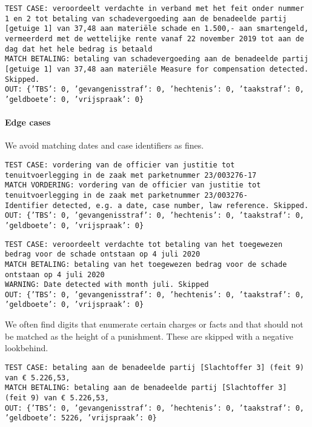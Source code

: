 \documentclass[a4paper]{article}
\begin{document}
\texttt{TEST CASE: %
veroordeelt verdachte in verband met het feit onder nummer 1 en 2 tot betaling van schadevergoeding aan de benadeelde partij [getuige 1] van  37,48 aan materiële schade en  1.500,- aan smartengeld, vermeerderd met de wettelijke rente vanaf 22 november 2019 tot aan de dag dat het hele bedrag is betaald\\
MATCH BETALING: betaling van schadevergoeding aan de benadeelde partij [getuige 1] van  37,48 aan materiële
Measure for compensation detected. Skipped.\\
OUT: \{'TBS': 0, 'gevangenisstraf': 0, 'hechtenis': 0, 'taakstraf': 0, 'geldboete': 0, 'vrijspraak': 0\}}

\paragraph{Edge cases}

We avoid matching dates and case identifiers as fines.

\texttt{TEST CASE:
vordering van de officier van justitie tot tenuitvoerlegging in de zaak met parketnummer 23/003276-17\\
MATCH VORDERING: vordering van de officier van justitie tot tenuitvoerlegging in de zaak met parketnummer 23/003276-\\
Identifier detected, e.g. a date, case number, law reference. Skipped.\\
OUT: \{'TBS': 0, 'gevangenisstraf': 0, 'hechtenis': 0, 'taakstraf': 0, 'geldboete': 0, 'vrijspraak': 0\}}

\texttt{TEST CASE:
veroordeelt verdachte tot betaling van het toegewezen bedrag voor de schade ontstaan op 4 juli 2020\\
MATCH BETALING: betaling van het toegewezen bedrag voor de schade ontstaan op 4 juli 2020\\
WARNING: Date detected with month juli. Skipped\\
OUT: \{'TBS': 0, 'gevangenisstraf': 0, 'hechtenis': 0, 'taakstraf': 0, 'geldboete': 0, 'vrijspraak': 0\}}

We often find digits that enumerate certain charges or facts and that should not be matched as the height of a punishment.
These are skipped with a negative lookbehind.

\texttt{TEST CASE: betaling aan de benadeelde partij [Slachtoffer 3] (feit 9) van € 5.226,53,\\
MATCH BETALING: betaling aan de benadeelde partij [Slachtoffer 3] (feit 9) van € 5.226,53,\\
OUT: \{'TBS': 0, 'gevangenisstraf': 0, 'hechtenis': 0, 'taakstraf': 0, 'geldboete': 5226, 'vrijspraak': 0\}}
\end{document}
